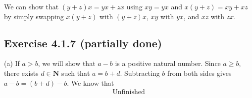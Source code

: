 \documentclass[12pt, oneside]{book}
\begin{document}
	We can show that $(y + z)x = yx + zx$ using $xy = yx$ and $x(y + z) = xy + xz$ by simply swapping $x(y + z)$ with $(y + z)x$, $xy$ with $yx$, and $xz$ with $zx$.
	
	\subsection*{Exercise 4.1.7 (partially done)}
	
	\noindent (a) If $a > b$, we will show that $a - b$ is a positive natural number. Since $a \ge b$, there exists $d \in \mathbf{N}$ such that $a = b + d$. Subtracting $b$ from both sides gives $a - b = (b + d) - b$. We know that
	\[\begin{split}
		\text{Unfinished}
	\end{split}\]
\end{document}
